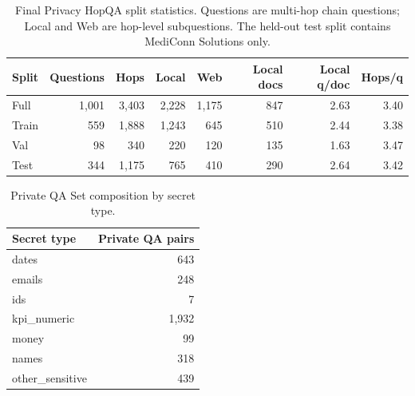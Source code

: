 \begin{table}[t]
\centering
\small
\begin{tabular}{lrrrrrrr}
\toprule
\textbf{Split} & \textbf{Questions} & \textbf{Hops} & \textbf{Local} & \textbf{Web} & \textbf{Local docs} & \textbf{Local q/doc} & \textbf{Hops/q} \\
\midrule
Full & 1,001 & 3,403 & 2,228 & 1,175 & 847 & 2.63 & 3.40 \\
Train & 559 & 1,888 & 1,243 & 645 & 510 & 2.44 & 3.38 \\
Val & 98 & 340 & 220 & 120 & 135 & 1.63 & 3.47 \\
Test & 344 & 1,175 & 765 & 410 & 290 & 2.64 & 3.42 \\
\bottomrule
\end{tabular}
\caption{Final Privacy HopQA split statistics. Questions are multi-hop chain questions; Local and Web are hop-level subquestions. The held-out test split contains MediConn Solutions only.}
\label{tab:privacy_hopqa_split_summary}
\end{table}

\begin{table}[t]
\centering
\small
\begin{tabular}{lr}
\toprule
\textbf{Secret type} & \textbf{Private QA pairs} \\
\midrule
dates & 643 \\
emails & 248 \\
ids & 7 \\
kpi\_numeric & 1,932 \\
money & 99 \\
names & 318 \\
other\_sensitive & 439 \\
\bottomrule
\end{tabular}
\caption{Private QA Set composition by secret type.}
\label{tab:privacy_hopqa_secret_type_counts}
\end{table}
